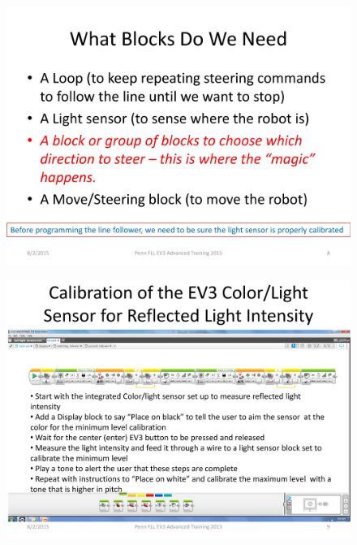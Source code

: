 \documentclass[11pt]{beamer}
\begin{document}
\begin{frame}
\begin{figure}
\includegraphics[scale=0.4]{ev3advanced2015/file-page8}
\end{figure}
\end{frame}

\begin{frame}
\begin{figure}
\includegraphics[scale=0.4]{ev3advanced2015/file-page9}
\end{figure}
\end{frame}
\end{document}
